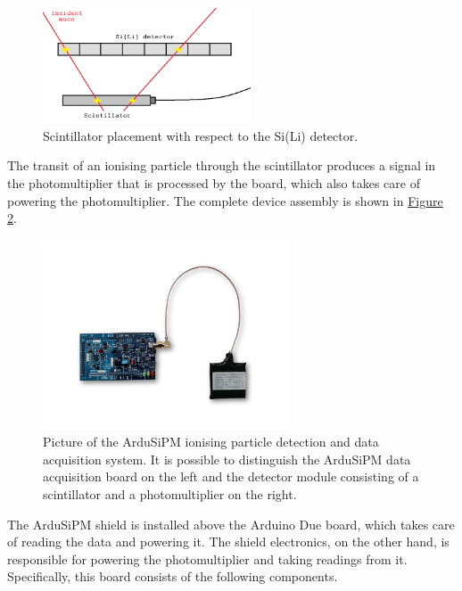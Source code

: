 \begin{figure}[h!]
    \centering
    \includegraphics[width=0.55\textwidth]{Images/chap3/scintillator_sensor_detail.png}
    \caption{Scintillator placement with respect to the Si(Li) detector.}
    \label{figScintillatorSiLi}
\end{figure}

\par
The transit of an ionising particle through the scintillator produces a signal in the photomultiplier that is processed by the board, which also takes care of powering the photomultiplier. The complete device assembly is shown in \hyperref[figArduiSiPM]{Figure \ref{figArduiSiPM}}.

\begin{figure}[h!]
    \centering
    \includegraphics[width=0.65\textwidth]{Images/chap3/ardusipm_cropped.pdf}
    \caption{Picture of the ArduSiPM ionising particle detection and data acquisition system. It is possible to distinguish the ArduSiPM data acquisition board on the left and the detector module consisting of a scintillator and a photomultiplier on the right.}
    \label{figArduiSiPM}
\end{figure}

The ArduSiPM shield is installed above the Arduino Due board, which takes care of reading the data and powering it. The shield electronics, on the other hand, is responsible for powering the photomultiplier and taking readings from it. Specifically, this board consists of the following components.

